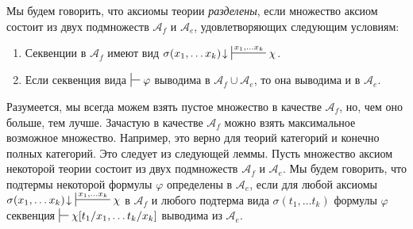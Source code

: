 \documentclass[reqno]{amsart}
\theoremstyle{definition}
\theoremstyle{remark}
\begin{document}
Мы будем говорить, что аксиомы теории \emph{разделены}, если множество аксиом состоит из двух подмножеств $\mathcal{A}_f$ и $\mathcal{A}_e$, удовлетворяющих следующим условиям:
\begin{enumerate}
\item \label{it:sep-f} Секвенции в $\mathcal{A}_f$ имеют вид $\sigma(x_1, \ldots x_k)\!\downarrow\ \sststile{}{x_1, \ldots x_k} \chi$.
\item \label{it:sep-e} Если секвенция вида $\sststile{}{} \varphi$ выводима в $\mathcal{A}_f \cup \mathcal{A}_e$, то она выводима и в $\mathcal{A}_e$.
\end{enumerate}

Разумеется, мы всегда можем взять пустое множество в качестве $\mathcal{A}_f$, но, чем оно больше, тем лучше.
Зачастую в качестве $\mathcal{A}_f$ можно взять максимальное возможное множество.
Например, это верно для теорий категорий и конечно полных категорий.
Это следует из следующей леммы.
Пусть множество аксиом некоторой теории состоит из двух подмножеств $\mathcal{A}_f$ и $\mathcal{A}_e$.
Мы будем говорить, что подтермы некоторой формулы $\varphi$ определены в $\mathcal{A}_e$, если для любой аксиомы $\sigma(x_1, \ldots x_k)\!\downarrow\ \sststile{}{x_1, \ldots x_k} \chi$ в $\mathcal{A}_f$
и любого подтерма вида $\sigma(t_1, \ldots t_k)$ формулы $\varphi$ секвенция $\sststile{}{} \chi[t_1/x_1, \ldots t_k/x_k]$ выводима из $\mathcal{A}_e$.
\end{document}
